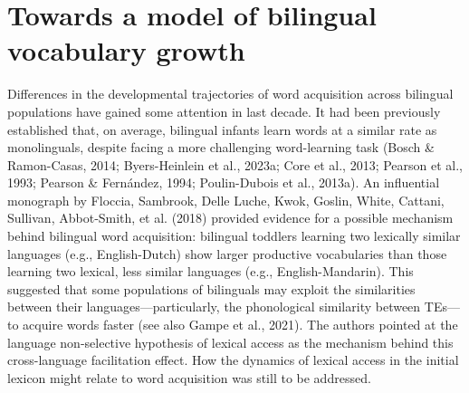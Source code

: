 \documentclass[
  12pt,
  b5paperpaper,
  twoside]{scrreprt}
\begin{document}
\hypertarget{towards-a-model-of-bilingual-vocabulary-growth}{%
\section{Towards a model of bilingual vocabulary
growth}\label{towards-a-model-of-bilingual-vocabulary-growth}}

Differences in the developmental trajectories of word acquisition across
bilingual populations have gained some attention in last decade. It had
been previously established that, on average, bilingual infants learn
words at a similar rate as monolinguals, despite facing a more
challenging word-learning task (Bosch \& Ramon-Casas, 2014;
Byers-Heinlein et al., 2023a; Core et al., 2013; Pearson et al., 1993;
Pearson \& Fernández, 1994; Poulin-Dubois et al., 2013a). An influential
monograph by Floccia, Sambrook, Delle Luche, Kwok, Goslin, White,
Cattani, Sullivan, Abbot‐Smith, et al. (2018) provided evidence for a
possible mechanism behind bilingual word acquisition: bilingual toddlers
learning two lexically similar languages (e.g., English-Dutch) show
larger productive vocabularies than those learning two lexical, less
similar languages (e.g., English-Mandarin). This suggested that some
populations of bilinguals may exploit the similarities between their
languages---particularly, the phonological similarity between TEs---to
acquire words faster (see also Gampe et al., 2021). The authors pointed
at the language non-selective hypothesis of lexical access as the
mechanism behind this cross-language facilitation effect. How the
dynamics of lexical access in the initial lexicon might relate to word
acquisition was still to be addressed.
\end{document}
